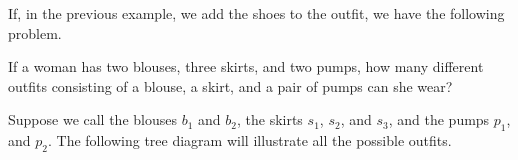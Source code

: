 If, in the previous example, we add the shoes to the outfit, we have the following problem.

\begin{example}
    If a woman has two blouses, three skirts, and two pumps, how many different outfits consisting of a blouse, a skirt, and a pair of pumps can she wear?
\end{example}

\begin{solution}
    Suppose we call the blouses $b_1$ and $b_2$, the skirts $s_1$, $s_2$, and $s_3$, and the pumps $p_1$, and $p_2$. The following tree diagram will illustrate all the possible outfits.

    \begin{center}
\end{center}
\end{solution}
